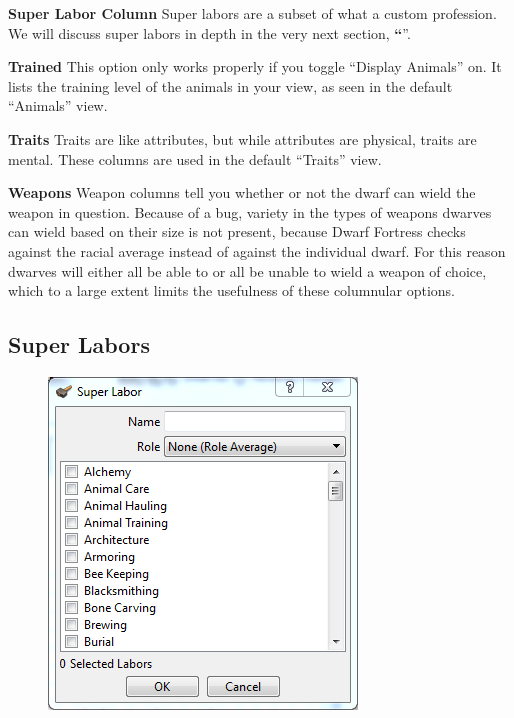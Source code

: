 \documentclass[]{article}
\newcommand{\jump}[1] {\textbf{``\nameref{sec:#1}}''}
\newcommand{\boldlist}[1] {
\vspace{12pt}
\noindent \textbf{#1}
}
\begin{document}
\boldlist{Super Labor Column} Super labors are a subset of what a custom profession. We will discuss
super labors in depth in the very next section, \jump{Super Labors}.

\boldlist{Trained} This option only works properly if you toggle ``Display Animals'' on. It lists the
training level of the animals in your view, as seen in the default ``Animals'' view.

\boldlist{Traits} Traits are like attributes, but while attributes are physical, traits are mental. These
columns are used in the default ``Traits'' view.

\boldlist{Weapons} Weapon columns tell you whether or not the dwarf can wield the weapon in question.
Because of a bug, variety in the types of weapons dwarves can wield based on their size is not present,
because Dwarf Fortress checks against the racial average instead of against the individual dwarf. For
this reason dwarves will either all be able to or all be unable to wield a weapon of choice, which
to a large extent limits the usefulness of these columnular options.

\subsection{Super Labors}
\label{sec:Super Labors}

\begin{figure}
\vspace{-20pt}
  \begin{center}
    \includegraphics[width=\linewidth]{Sec4Fig18}
  \end{center}
\end{figure}
\end{document}
